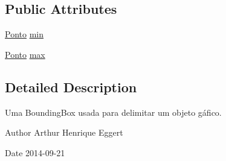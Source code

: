 \subsection*{Public Attributes}
\begin{DoxyCompactItemize}
\item 
\hyperlink{classPonto}{Ponto} \hyperlink{classBBox_ab65bac30fa278acb493ac63631ad83e3}{min}
\item 
\hyperlink{classPonto}{Ponto} \hyperlink{classBBox_a2eb4d802aaaf2e65c7a03faa91855081}{max}
\end{DoxyCompactItemize}


\subsection{Detailed Description}
Uma Bounding\+Box usada para delimitar um objeto gáfico. 

\begin{DoxyAuthor}{Author}
Arthur Henrique Eggert 
\end{DoxyAuthor}
\begin{DoxyDate}{Date}
2014-\/09-\/21 
\end{DoxyDate}


